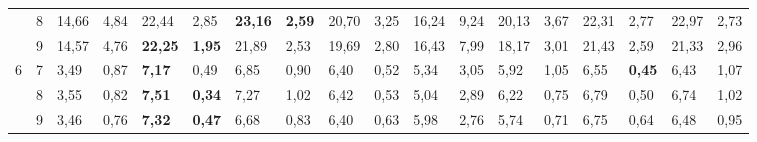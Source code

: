 \documentclass[conference]{IEEEtran}
\begin{document}
\begin{table}[]
\begin{tabular}{|cl|ll|ll|ll|ll|ll|ll|ll|ll|}
		\multicolumn{1}{|c|}{}                    & 8          & \multicolumn{1}{l|}{14,66}         & 4,84          & \multicolumn{1}{l|}{22,44}          & 2,85          & \multicolumn{1}{l|}{\textbf{23,16}} & \textbf{2,59} & \multicolumn{1}{l|}{20,70}         & 3,25          & \multicolumn{1}{l|}{16,24}                & 9,24 & \multicolumn{1}{l|}{20,13}          & 3,67 & \multicolumn{1}{l|}{22,31}          & 2,77          & \multicolumn{1}{l|}{22,97}          & 2,73 \\ \cline{2-18} 
		\multicolumn{1}{|c|}{}                    & 9          & \multicolumn{1}{l|}{14,57}         & 4,76          & \multicolumn{1}{l|}{\textbf{22,25}} & \textbf{1,95} & \multicolumn{1}{l|}{21,89}          & 2,53          & \multicolumn{1}{l|}{19,69}         & 2,80          & \multicolumn{1}{l|}{16,43}                & 7,99 & \multicolumn{1}{l|}{18,17}          & 3,01 & \multicolumn{1}{l|}{21,43}          & 2,59          & \multicolumn{1}{l|}{21,33}          & 2,96 \\ \hline
		\multicolumn{1}{|c|}{\multirow{3}{*}{6}}  & 7          & \multicolumn{1}{l|}{3,49}          & 0,87          & \multicolumn{1}{l|}{\textbf{7,17}}  & 0,49          & \multicolumn{1}{l|}{6,85}           & 0,90          & \multicolumn{1}{l|}{6,40}          & 0,52          & \multicolumn{1}{l|}{5,34}                 & 3,05 & \multicolumn{1}{l|}{5,92}           & 1,05 & \multicolumn{1}{l|}{6,55}           & \textbf{0,45} & \multicolumn{1}{l|}{6,43}           & 1,07 \\ \cline{2-18} 
		\multicolumn{1}{|c|}{}                    & 8          & \multicolumn{1}{l|}{3,55}          & 0,82          & \multicolumn{1}{l|}{\textbf{7,51}}  & \textbf{0,34} & \multicolumn{1}{l|}{7,27}           & 1,02          & \multicolumn{1}{l|}{6,42}          & 0,53          & \multicolumn{1}{l|}{5,04}                 & 2,89 & \multicolumn{1}{l|}{6,22}           & 0,75 & \multicolumn{1}{l|}{6,79}           & 0,50          & \multicolumn{1}{l|}{6,74}           & 1,02 \\ \cline{2-18} 
		\multicolumn{1}{|c|}{}                    & 9          & \multicolumn{1}{l|}{3,46}          & 0,76          & \multicolumn{1}{l|}{\textbf{7,32}}  & \textbf{0,47} & \multicolumn{1}{l|}{6,68}           & 0,83          & \multicolumn{1}{l|}{6,40}          & 0,63          & \multicolumn{1}{l|}{5,98}                 & 2,76 & \multicolumn{1}{l|}{5,74}           & 0,71 & \multicolumn{1}{l|}{6,75}           & 0,64          & \multicolumn{1}{l|}{6,48}           & 0,95 \\ \hline

\end{tabular}
\end{table}
\end{document}
